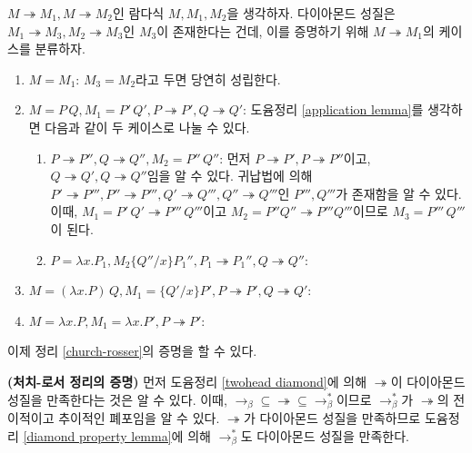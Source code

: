 \documentclass[b5paper, 10pt]{book}
\theoremstyle{definition}
\newenvironment{pf*}{\pushQED{\qed}\pf}{\popQED\endpf}
\begin{document}
\begin{pf*}
    $M \twoheadrightarrow M_1, M \twoheadrightarrow M_2$인 람다식 $M, M_1, M_2$을 생각하자.
    다이아몬드 성질은 $M_1 \twoheadrightarrow M_3, M_2 \twoheadrightarrow M_3$인 $M_3$이
    존재한다는 건데, 이를 증명하기 위해 $M \twoheadrightarrow M_1$의 케이스를 분류하자.
    \begin{enumerate}
        \item $M = M_1$:
        $M_3 = M_2$라고 두면 당연히 성립한다.
        \item $M = P\, Q, M_1 = P' \, Q', P\twoheadrightarrow P', Q \twoheadrightarrow Q'$:
        도윰정리 \ref{application lemma}를 생각하면 다음과 같이 두 케이스로 나눌 수 있다.
        \begin{enumerate}
            \item $P \twoheadrightarrow P'', Q \twoheadrightarrow Q'', 
             M_2 = P'' \, Q''$: 먼저 $P \twoheadrightarrow P', P \twoheadrightarrow P''$이고,
             $Q \twoheadrightarrow Q', Q \twoheadrightarrow Q''$임을 알 수 있다. 귀납법에 의해 
             $P' \twoheadrightarrow P''', P'' \twoheadrightarrow P''', Q' \twoheadrightarrow Q''',
             Q'' \twoheadrightarrow Q'''$인 $P''', Q'''$가 존재함을 알 수 있다. 이때, 
             $M_1 = P' \, Q' \twoheadrightarrow P''' \, Q'''$이고 $M_2 = P'' Q'' \twoheadrightarrow P''' Q'''$이므로
             $M_3 = P''' \, Q'''$이 된다.
             \item $P = \lambda x. P_1, M_2 \{Q'' / x\} P_1'' , P_1 \twoheadrightarrow P_1'', 
             Q \twoheadrightarrow Q''$: 
        \end{enumerate}
        \item $M = (\lambda x. P) \, Q, M_1 = \{Q' / x \}P', P \twoheadrightarrow P', Q \twoheadrightarrow Q'$:
        \item $M = \lambda x. P, M_1 = \lambda x .P', P \twoheadrightarrow P'$:
    \end{enumerate}
\end{pf*}
이제 정리 \ref{church-rosser}의 증명을 할 수 있다. 
\begin{pf*} 
    \textbf{(처치-로서 정리의 증명)} 먼저 도윰정리 \ref{twohead diamond}에 의해 $\twoheadrightarrow$이
    다이아몬드 성질을 만족한다는 것은 알 수 있다. 이때, $\rightarrow_\beta \subseteq \twoheadrightarrow
    \subseteq \rightarrow_\beta^*$이므로 $\rightarrow_\beta^*$가 $\twoheadrightarrow$의 전이적이고
    추이적인 폐포임을 알 수 있다. $\twoheadrightarrow$가 다이아몬드 성질을 만족하므로 도윰정리 
    \ref{diamond property lemma}에 의해 $\rightarrow_\beta^*$도 다이아몬드 성질을 만족한다.
\end{pf*}
\end{document}
